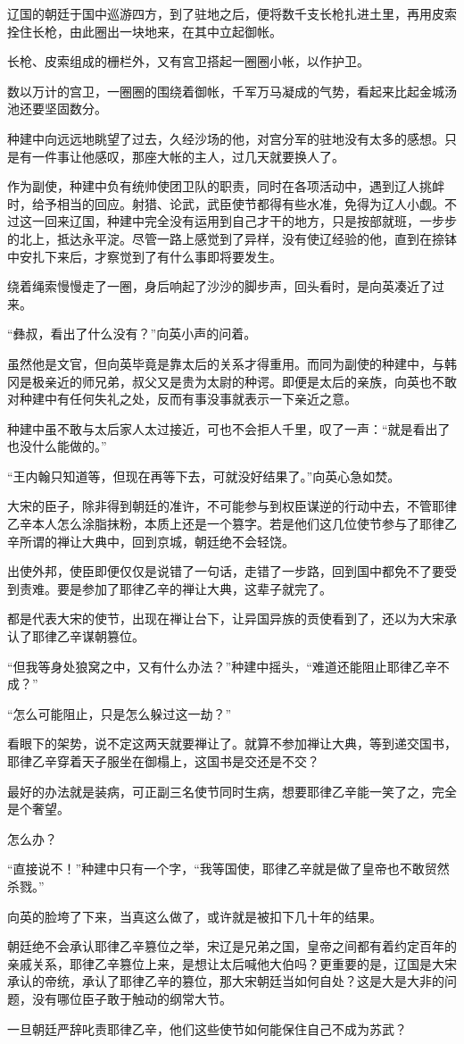 辽国的朝廷于国中巡游四方，到了驻地之后，便将数千支长枪扎进土里，再用皮索拴住长枪，由此圈出一块地来，在其中立起御帐。

长枪、皮索组成的栅栏外，又有宫卫搭起一圈圈小帐，以作护卫。

数以万计的宫卫，一圈圈的围绕着御帐，千军万马凝成的气势，看起来比起金城汤池还要坚固数分。

种建中向远远地眺望了过去，久经沙场的他，对宫分军的驻地没有太多的感想。只是有一件事让他感叹，那座大帐的主人，过几天就要换人了。

作为副使，种建中负有统帅使团卫队的职责，同时在各项活动中，遇到辽人挑衅时，给予相当的回应。射猎、论武，武臣使节都得有些水准，免得为辽人小觑。不过这一回来辽国，种建中完全没有运用到自己才干的地方，只是按部就班，一步步的北上，抵达永平淀。尽管一路上感觉到了异样，没有使辽经验的他，直到在捺钵中安扎下来后，才察觉到了有什么事即将要发生。

绕着绳索慢慢走了一圈，身后响起了沙沙的脚步声，回头看时，是向英凑近了过来。

“彝叔，看出了什么没有？”向英小声的问着。

虽然他是文官，但向英毕竟是靠太后的关系才得重用。而同为副使的种建中，与韩冈是极亲近的师兄弟，叔父又是贵为太尉的种谔。即便是太后的亲族，向英也不敢对种建中有任何失礼之处，反而有事没事就表示一下亲近之意。

种建中虽不敢与太后家人太过接近，可也不会拒人千里，叹了一声：“就是看出了也没什么能做的。”

“王内翰只知道等，但现在再等下去，可就没好结果了。”向英心急如焚。

大宋的臣子，除非得到朝廷的准许，不可能参与到权臣谋逆的行动中去，不管耶律乙辛本人怎么涂脂抹粉，本质上还是一个篡字。若是他们这几位使节参与了耶律乙辛所谓的禅让大典中，回到京城，朝廷绝不会轻饶。

出使外邦，使臣即便仅仅是说错了一句话，走错了一步路，回到国中都免不了要受到责难。要是参加了耶律乙辛的禅让大典，这辈子就完了。

都是代表大宋的使节，出现在禅让台下，让异国异族的贡使看到了，还以为大宋承认了耶律乙辛谋朝篡位。

“但我等身处狼窝之中，又有什么办法？”种建中摇头，“难道还能阻止耶律乙辛不成？”

“怎么可能阻止，只是怎么躲过这一劫？”

看眼下的架势，说不定这两天就要禅让了。就算不参加禅让大典，等到递交国书，耶律乙辛穿着天子服坐在御榻上，这国书是交还是不交？

最好的办法就是装病，可正副三名使节同时生病，想要耶律乙辛能一笑了之，完全是个奢望。

怎么办？

“直接说不！”种建中只有一个字，“我等国使，耶律乙辛就是做了皇帝也不敢贸然杀戮。”

向英的脸垮了下来，当真这么做了，或许就是被扣下几十年的结果。

朝廷绝不会承认耶律乙辛篡位之举，宋辽是兄弟之国，皇帝之间都有着约定百年的亲戚关系，耶律乙辛篡位上来，是想让太后喊他大伯吗？更重要的是，辽国是大宋承认的帝统，承认了耶律乙辛的篡位，那大宋朝廷当如何自处？这是大是大非的问题，没有哪位臣子敢于触动的纲常大节。

一旦朝廷严辞叱责耶律乙辛，他们这些使节如何能保住自己不成为苏武？
